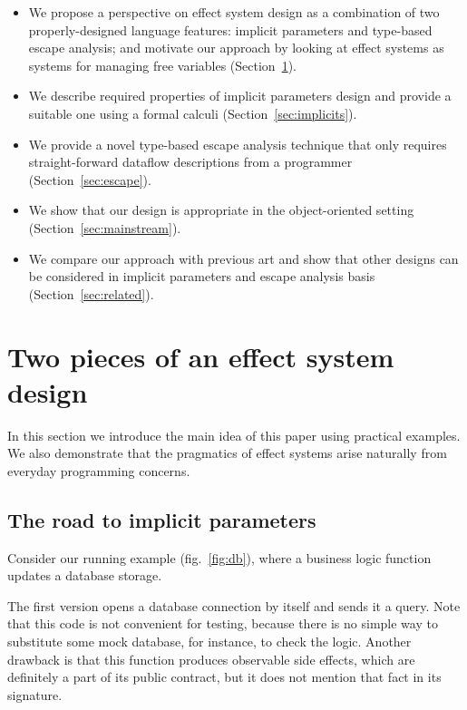 \documentclass[acmsmall]{acmart}
\begin{document}
\begin{itemize}
    \item We propose a perspective on effect system design as a combination of two properly-designed language features: implicit parameters and type-based escape analysis; and motivate our approach by looking at effect systems as systems for managing free variables (Section~\ref{sec:idea}).
    \item We describe required properties of implicit parameters design and provide a suitable one using a formal calculi (Section~\ref{sec:implicits}).
    \item We provide a novel type-based escape analysis technique that only requires straight-forward dataflow descriptions from a programmer (Section~\ref{sec:escape}).
    \item We show that our design is appropriate in the object-oriented setting (Section~\ref{sec:mainstream}). %
    \item We compare our approach with previous art and show that other designs can be considered in implicit parameters and escape analysis basis (Section~\ref{sec:related}).
\end{itemize}


\section{Two pieces of an effect system design} \label{sec:idea}

In this section we introduce the main idea of this paper using practical examples.
We also demonstrate that the pragmatics of effect systems arise naturally from everyday programming concerns.

\subsection{The road to implicit parameters} \label{subsec:implicits}

Consider our running example (fig.\ \ref{fig:db}), where a business logic function updates a database storage.

The first version opens a database connection by itself and sends it a query.
Note that this code is not convenient for testing, because there is no simple way to substitute some mock database, for instance, to check the logic.
Another drawback is that this function produces observable side effects, which are definitely a part of its public contract, but it does not mention that fact in its signature.
\end{document}
